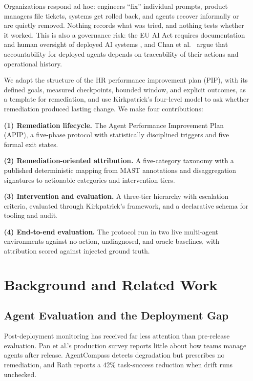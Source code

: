 \documentclass[conference]{IEEEtran}
\begin{document}
Organizations respond ad hoc: engineers ``fix'' individual prompts, product managers file tickets, systems get rolled back, and agents recover informally or are quietly removed. Nothing records what was tried, and nothing tests whether it worked. This is also a governance risk: the EU AI Act requires documentation and human oversight of deployed AI systems \cite{ref6}, and Chan et al.~\cite{ref14} argue that accountability for deployed agents depends on traceability of their actions and operational history.

We adapt the structure of the HR performance improvement plan (PIP), with its defined goals, measured checkpoints, bounded window, and explicit outcomes, as a template for remediation, and use Kirkpatrick's four-level model \cite{ref7} to ask whether remediation produced lasting change. We make four contributions:

\noindent\textbf{(1) Remediation lifecycle.} The Agent Performance Improvement Plan (APIP), a five-phase protocol with statistically disciplined triggers and five formal exit states.

\noindent\textbf{(2) Remediation-oriented attribution.} A five-category taxonomy with a published deterministic mapping from MAST annotations \cite{ref8} and disaggregation signatures to actionable categories and intervention tiers.

\noindent\textbf{(3) Intervention and evaluation.} A three-tier hierarchy with escalation criteria, evaluated through Kirkpatrick's framework, and a declarative schema for tooling and audit.

\noindent\textbf{(4) End-to-end evaluation.} The protocol run in two live multi-agent environments against no-action, undiagnosed, and oracle baselines, with attribution scored against injected ground truth.

\section{Background and Related Work}

\subsection{Agent Evaluation and the Deployment Gap}

Post-deployment monitoring has received far less attention than pre-release evaluation. Pan et al.'s production survey \cite{ref5} reports little about how teams manage agents after release. AgentCompass \cite{ref9} detects degradation but prescribes no remediation, and Rath \cite{ref10} reports a 42\% task-success reduction when drift runs unchecked.
\end{document}
